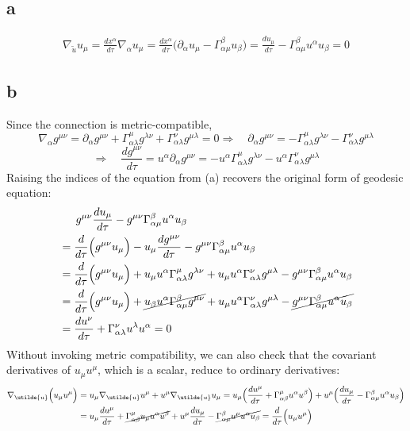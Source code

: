 \documentclass{article}
\begin{document}
\subsection*{a}
\begin{align*}
 \nabla_{\utilde{u}}u_\mu = \frac{dx^\alpha}{d\tau} \nabla_{\alpha}u_\mu
= \frac{dx^\alpha}{d\tau} \Big(\partial_\alpha u_\mu - \Gamma^{\beta}_{\alpha\mu}u_\beta \Big)
= \frac{du_\mu}{d\tau} - \Gamma^\beta_{\alpha\mu}u^\alpha u_\beta = 0
\end{align*}
\subsection*{b}
Since the connection is metric-compatible,
\[\nabla_\alpha g^{\mu\nu} = \partial_\alpha g^{\mu\nu} + \Gamma^{\mu}_{\alpha\lambda} g^{\lambda\nu} + \Gamma ^{\nu}_{\alpha\lambda} g^{\mu\lambda} = 0
\Rightarrow\quad \partial_\alpha g^{\mu\nu} = -\Gamma^{\mu}_{\alpha\lambda} g^{\lambda\nu} - \Gamma ^{\nu}_{\alpha\lambda} g^{\mu\lambda}\]
\[ \Rightarrow\quad \frac{dg^{\mu\nu}}{d\tau} = u^\alpha  \partial_\alpha g^{\mu\nu} = -u^\alpha\Gamma^{\mu}_{\alpha\lambda} g^{\lambda\nu} - u^\alpha\Gamma ^{\nu}_{\alpha\lambda} g^{\mu\lambda} \]
Raising the indices of the equation from (a) recovers the original form of geodesic equation:
\begin{align*} 
	&\indent g^{\mu\nu}\frac{du_\mu}{d\tau} - g^{\mu\nu}\Gamma^\beta_{\alpha\mu}u^\alpha u_\beta \\
&= \frac{d}{d\tau}\Big(g^{\mu\nu}u_\mu \Big) -  u_\mu\frac{dg^{\mu\nu}}{d\tau}- g^{\mu\nu} \Gamma^\beta_{\alpha\mu}u^\alpha u_\beta \\
&= \frac{d}{d\tau}\Big(g^{\mu\nu}u_\mu \Big) +  u_\mu u^\alpha\Gamma^{\mu}_{\alpha\lambda} g^{\lambda\nu} + u_\mu  u^\alpha\Gamma ^{\nu}_{\alpha\lambda} g^{\mu\lambda} - g^{\mu\nu} \Gamma^\beta_{\alpha\mu}u^\alpha u_\beta \\
&= \frac{d}{d\tau}\Big(g^{\mu\nu}u_\mu \Big) +  \cancel{u_\beta u^\alpha\Gamma^{\beta}_{\alpha\mu} g^{\mu\nu}} + u_\mu  u^\alpha\Gamma ^{\nu}_{\alpha\lambda} g^{\mu\lambda} - \cancel{g^{\mu\nu} \Gamma^\beta_{\alpha\mu}u^\alpha u_\beta} \\
&= \frac{du^\nu}{d\tau} + \Gamma ^{\nu}_{\alpha\lambda}u^\lambda  u^\alpha = 0
\end{align*}
Without invoking metric compatibility, we can also check that the covariant derivatives of $u_\mu u^\mu$, which is a scalar, reduce to ordinary derivatives:
\begin{align*}
 \nabla_{\utilde{u}} \Big(u_\mu u^\mu\Big) 
&= u_\mu \nabla_{\utilde{u}} u^\mu + u^\mu \nabla_{\utilde{u}} u_\mu 
=  u_\mu \Big(\frac{du^\mu}{d\tau} + \Gamma^\mu_{\alpha\beta}u^\alpha u^\beta \Big)
	+ u^\mu \Big(  \frac{du_\mu}{d\tau} - \Gamma^\beta_{\alpha\mu}u^\alpha u_\beta \Big)\\
&=  u_\mu\frac{du^\mu}{d\tau} + \cancel{\Gamma^\mu_{\alpha\beta}u_\mu u^\alpha u^\beta}
	+  u^\mu  \frac{du_\mu}{d\tau} - \cancel{\Gamma^\beta_{\alpha\mu}u^\mu  u^\alpha u_\beta}
= \frac{d}{d\tau}\Big(u_\mu u^\mu \Big)
\end{align*}
\end{document}
